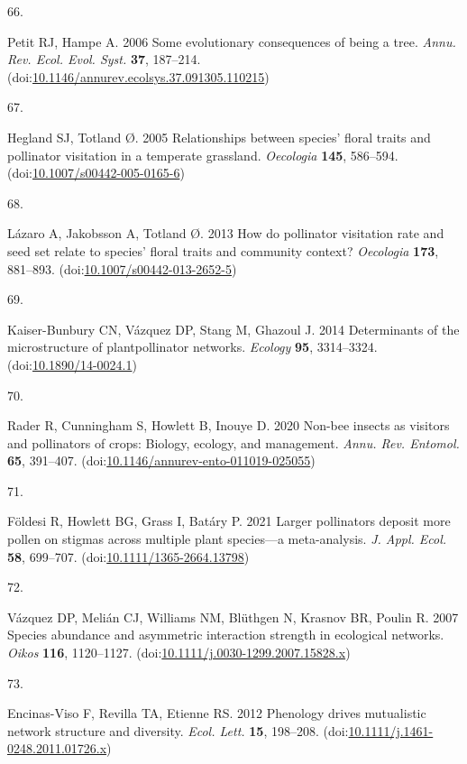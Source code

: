 \documentclass[
  12pt,
  a4paper,
]{article}
\newlength{\cslhangindent}
\newlength{\csllabelwidth}
\newlength{\cslentryspacingunit} %
\newenvironment{CSLReferences}[2] %
 {%
  \setlength{\parindent}{0pt}
  \ifodd #1
  \let\oldpar\par
  \def\par{\hangindent=\cslhangindent\oldpar}
  \fi
  \setlength{\parskip}{#2\cslentryspacingunit}
 }%
 {}
\newcommand{\CSLLeftMargin}[1]{\parbox[t]{\csllabelwidth}{#1}}
\newcommand{\CSLRightInline}[1]{\parbox[t]{\linewidth - \csllabelwidth}{#1}\break}
\begin{document}
\begin{CSLReferences}{0}{0}
\leavevmode{}%
\CSLLeftMargin{66. }
\CSLRightInline{Petit RJ, Hampe A. 2006 Some evolutionary consequences of being a tree. \emph{Annu. Rev. Ecol. Evol. Syst.} \textbf{37}, 187--214. (doi:\href{https://doi.org/10.1146/annurev.ecolsys.37.091305.110215}{10.1146/annurev.ecolsys.37.091305.110215})}

\leavevmode{}%
\CSLLeftMargin{67. }
\CSLRightInline{Hegland SJ, Totland Ø. 2005 Relationships between species' floral traits and pollinator visitation in a temperate grassland. \emph{Oecologia} \textbf{145}, 586--594. (doi:\href{https://doi.org/10.1007/s00442-005-0165-6}{10.1007/s00442-005-0165-6})}

\leavevmode{}%
\CSLLeftMargin{68. }
\CSLRightInline{Lázaro A, Jakobsson A, Totland Ø. 2013 How do pollinator visitation rate and seed set relate to species' floral traits and community context? \emph{Oecologia} \textbf{173}, 881--893. (doi:\href{https://doi.org/10.1007/s00442-013-2652-5}{10.1007/s00442-013-2652-5})}

\leavevmode{}%
\CSLLeftMargin{69. }
\CSLRightInline{Kaiser-Bunbury CN, Vázquez DP, Stang M, Ghazoul J. 2014 Determinants of the microstructure of plant\textendash pollinator networks. \emph{Ecology} \textbf{95}, 3314--3324. (doi:\href{https://doi.org/10.1890/14-0024.1}{10.1890/14-0024.1})}

\leavevmode{}%
\CSLLeftMargin{70. }
\CSLRightInline{Rader R, Cunningham S, Howlett B, Inouye D. 2020 Non-bee insects as visitors and pollinators of crops: Biology, ecology, and management. \emph{Annu. Rev. Entomol.} \textbf{65}, 391--407. (doi:\href{https://doi.org/10.1146/annurev-ento-011019-025055}{10.1146/annurev-ento-011019-025055})}

\leavevmode{}%
\CSLLeftMargin{71. }
\CSLRightInline{Földesi R, Howlett BG, Grass I, Batáry P. 2021 Larger pollinators deposit more pollen on stigmas across multiple plant species---a meta-analysis. \emph{J. Appl. Ecol.} \textbf{58}, 699--707. (doi:\href{https://doi.org/10.1111/1365-2664.13798}{10.1111/1365-2664.13798})}

\leavevmode{}%
\CSLLeftMargin{72. }
\CSLRightInline{Vázquez DP, Melián CJ, Williams NM, Blüthgen N, Krasnov BR, Poulin R. 2007 Species abundance and asymmetric interaction strength in ecological networks. \emph{Oikos} \textbf{116}, 1120--1127. (doi:\href{https://doi.org/10.1111/j.0030-1299.2007.15828.x}{10.1111/j.0030-1299.2007.15828.x})}

\leavevmode{}%
\CSLLeftMargin{73. }
\CSLRightInline{Encinas-Viso F, Revilla TA, Etienne RS. 2012 Phenology drives mutualistic network structure and diversity. \emph{Ecol. Lett.} \textbf{15}, 198--208. (doi:\href{https://doi.org/10.1111/j.1461-0248.2011.01726.x}{10.1111/j.1461-0248.2011.01726.x})}

\end{CSLReferences}
\end{document}
